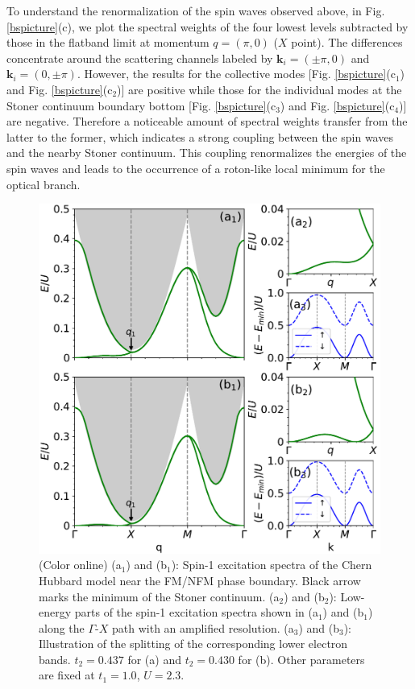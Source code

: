 \documentclass[amsmath,superscriptaddress,showpacs,aps,prb,twocolumn]{revtex4-1}
\begin{document}
\par To understand the renormalization of the spin waves observed above, in Fig. \ref{bspicture}(c), we plot the spectral weights of the four lowest levels subtracted by those in the flatband limit at momentum $q=(\pi,0)$ ($X$ point). The differences concentrate around the scattering channels labeled by $\mathbf{k}_i=(\pm\pi,0)$ and $\mathbf{k}_i=(0,\pm\pi)$. However, the results for the collective modes [Fig. \ref{bspicture}($\text{c}_1$) and Fig. \ref{bspicture}($\text{c}_2$)] are positive while those for the individual modes at the Stoner continuum boundary bottom [Fig. \ref{bspicture}($\text{c}_3$) and Fig. \ref{bspicture}($\text{c}_4$)] are negative. Therefore a noticeable amount of spectral weights transfer from the latter to the former, which indicates a strong coupling between the spin waves and the nearby Stoner continuum. This coupling renormalizes the energies of the spin waves and leads to the occurrence of a roton-like local minimum for the optical branch.

\begin{figure}
\includegraphics[width=\columnwidth]{pbcispectrum}
\caption{(Color online) (a$_1$) and (b$_1$): Spin-1 excitation spectra of the Chern Hubbard model near the FM/NFM phase boundary. Black arrow marks the minimum of the Stoner continuum. (a$_2$) and (b$_2$): Low-energy parts of the spin-1 excitation spectra shown in (a$_1$) and (b$_1$) along the $\Gamma$-$X$ path with an amplified resolution. (a$_3$) and (b$_3$): Illustration of the splitting of the corresponding lower electron bands. $t_2=0.437$ for (a) and $t_2=0.430$ for (b). Other parameters are fixed at $t_1=1.0$, $U=2.3$.}
\label{pbcispectrum}
\end{figure}
\end{document}
